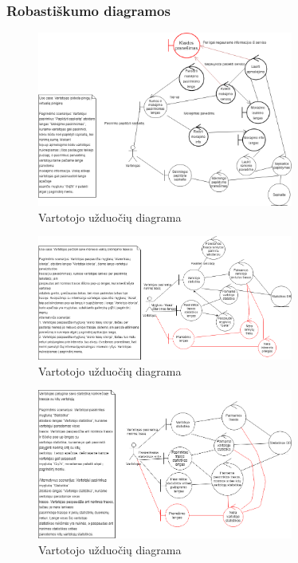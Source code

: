 \documentclass[oneside]{VUMIFPSkursinis}
\begin{document}
		\subsubsection{Robastiškumo diagramos}

\pagebreak

			\begin{figure}[h]
    				\centering
    				\includegraphics[width=0.75\textwidth]{rob1.png}
    				\caption{Vartotojo užduočių diagrama}
    				\label{fig:VartotojoUseCasel}
			\end{figure}

			\begin{figure}[h]
    				\centering
    				\includegraphics[width=0.75\textwidth]{rob2.png}
    				\caption{Vartotojo užduočių diagrama}
    				\label{fig:VartotojoUseCasel}
			\end{figure}

			\begin{figure}[h]
    				\centering
    				\includegraphics[width=0.75\textwidth]{rob3.png}
    				\caption{Vartotojo užduočių diagrama}
    				\label{fig:VartotojoUseCasel}
			\end{figure}
\end{document}
